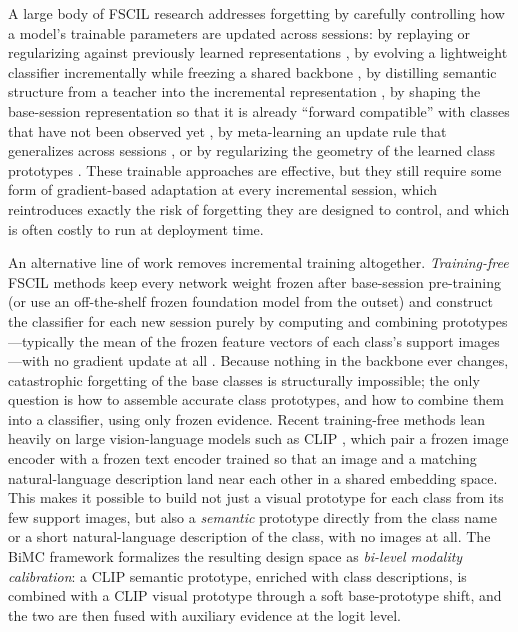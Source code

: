 \documentclass{iutbscthesis}
\begin{document}
A large body of FSCIL research addresses forgetting by carefully controlling how a model's trainable parameters are updated across sessions: by replaying or regularizing against previously learned representations \autocite{rebuffi2017icarl, li2016learning}, by evolving a lightweight classifier incrementally while freezing a shared backbone \autocite{zhang2021continually}, by distilling semantic structure from a teacher into the incremental representation \autocite{cheraghian2021semantic}, by shaping the base-session representation so that it is already ``forward compatible'' with classes that have not been observed yet \autocite{zhou2022forward}, by meta-learning an update rule that generalizes across sessions \autocite{chi2022metafscil}, or by regularizing the geometry of the learned class prototypes \autocite{zhao2023classaware}. These trainable approaches are effective, but they still require some form of gradient-based adaptation at every incremental session, which reintroduces exactly the risk of forgetting they are designed to control, and which is often costly to run at deployment time.

An alternative line of work removes incremental training altogether. \emph{Training-free} FSCIL methods keep every network weight frozen after base-session pre-training (or use an off-the-shelf frozen foundation model from the outset) and construct the classifier for each new session purely by computing and combining prototypes---typically the mean of the frozen feature vectors of each class's support images---with no gradient update at all \autocite{wang2023teen, goswami2023fecam, chen2025bimc}. Because nothing in the backbone ever changes, catastrophic forgetting of the base classes is structurally impossible; the only question is how to assemble accurate class prototypes, and how to combine them into a classifier, using only frozen evidence. Recent training-free methods lean heavily on large vision-language models such as CLIP \autocite{radford2021learning}, which pair a frozen image encoder with a frozen text encoder trained so that an image and a matching natural-language description land near each other in a shared embedding space. This makes it possible to build not just a visual prototype for each class from its few support images, but also a \emph{semantic} prototype directly from the class name or a short natural-language description of the class, with no images at all. The BiMC framework \autocite{chen2025bimc} formalizes the resulting design space as \emph{bi-level modality calibration}: a CLIP semantic prototype, enriched with class descriptions, is combined with a CLIP visual prototype through a soft base-prototype shift, and the two are then fused with auxiliary evidence at the logit level.
\end{document}
